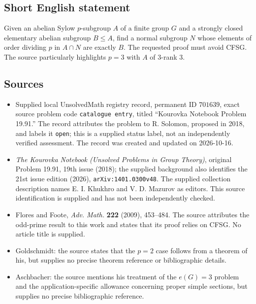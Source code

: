 \documentclass[11pt]{article}
\begin{document}
\subsection{Short English statement}
Given an abelian Sylow \(p\)-subgroup \(A\) of a finite group \(G\) and a strongly closed elementary abelian subgroup \(B\leq A\), find a normal subgroup \(N\) whose elements of order dividing \(p\) in \(A\cap N\) are exactly \(B\). The requested proof must avoid CFSG. The source particularly highlights \(p=3\) with \(A\) of \(3\)-rank \(3\).
\subsection{Sources}
\begin{itemize}
\item Supplied local UnsolvedMath registry record, permanent ID \(701639\), exact source problem code \texttt{catalogue entry}, titled ``Kourovka Notebook Problem 19.91.'' The record attributes the problem to R. Solomon, proposed in 2018, and labels it \texttt{open}; this is a supplied status label, not an independently verified assessment. The record was created and updated on 2026-10-16.
\item \emph{The Kourovka Notebook (Unsolved Problems in Group Theory)}, original Problem 19.91, 19th issue (2018); the supplied background also identifies the 21st issue edition (2026), \texttt{arXiv:1401.0300v48}. The supplied collection description names E. I. Khukhro and V. D. Mazurov as editors. This source identification is supplied and has not been independently checked.
\item Flores and Foote, \emph{Adv. Math.} \textbf{222} (2009), 453--484. The source attributes the odd-prime result to this work and states that its proof relies on CFSG. No article title is supplied.
\item Goldschmidt: the source states that the \(p=2\) case follows from a theorem of his, but supplies no precise theorem reference or bibliographic details.
\item Aschbacher: the source mentions his treatment of the \(e(G)=3\) problem and the application-specific allowance concerning proper simple sections, but supplies no precise bibliographic reference.
\end{itemize}
\end{document}
